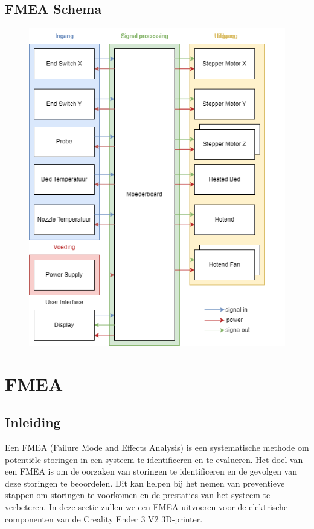 \documentclass{article}
\begin{document}
\subsection{FMEA Schema}
\begin{figure}[H]
  \centering
  \includegraphics[width=\textwidth]{Creality Ender V2.drawio.png}
\end{figure}


\newpage

\section{FMEA}
\subsection{Inleiding}
Een FMEA (Failure Mode and Effects Analysis) is een systematische methode om potentiële storingen in een systeem te identificeren en te evalueren. Het doel van een FMEA is om de oorzaken van storingen te identificeren en de gevolgen van deze storingen te beoordelen. Dit kan helpen bij het nemen van preventieve stappen om storingen te voorkomen en de prestaties van het systeem te verbeteren. In deze sectie zullen we een FMEA uitvoeren voor de elektrische componenten van de Creality Ender 3 V2 3D-printer.
\end{document}
